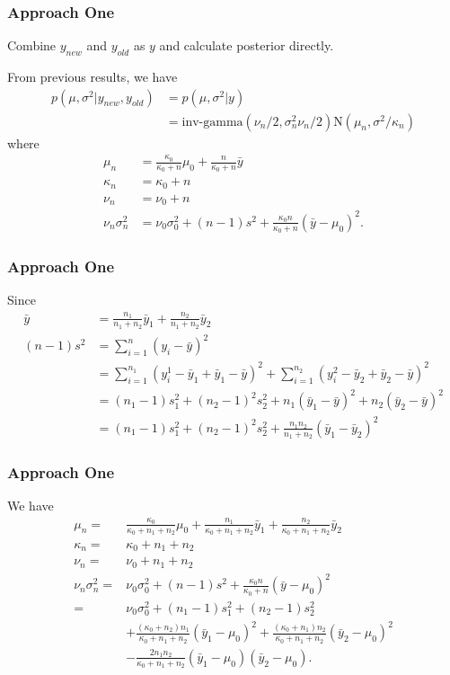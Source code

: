 \documentclass[compress]{beamer}
\begin{document}
\begin{frame}
\frametitle{Approach One }
Combine $y_{new}$ and $y_{old}$ as $y$ and calculate posterior directly.

From previous results, we have
\begin{align*}
p(\mu,\sigma^2|y_{new},y_{old})&=p(\mu,\sigma^2|y)\\
&=\mbox{inv-gamma}(\nu_n/2, \sigma_n^2\nu_n/2) \mbox{N}(\mu_n, \sigma^2/\kappa_n)
\end{align*}
where
\begin{align*}
\mu_n &= \frac{\kappa_0}{\kappa_0+n}\mu_0+\frac{n}{\kappa_0+n}\bar{y}\\
\kappa_n &=\kappa_0+n\\
\nu_n &= \nu_0+n\\
\nu_n\sigma^2_n & = \nu_0\sigma_0^2+(n-1)s^2+\frac{\kappa_0 n}{\kappa_0 +n}(\bar{y}-\mu_0)^2.
\end{align*}
\end{frame}

\begin{frame}
\frametitle{Approach One}
Since 
\begin{align*}
\bar{y} &= \frac{n_1}{n_1+n_2}\bar{y}_1+\frac{n_2}{n_1+n_2}\bar{y}_2\\
(n-1)s^2 &=\sum^n_{i=1}(y_i-\bar{y})^2\\
&=\sum^{n_1}_{i=1}(y_i^1-\bar{y}_1+\bar{y}_1-\bar{y})^2+\sum^{n_2}_{i=1}(y_i^2-\bar{y}_2+\bar{y}_2-\bar{y})^2\\
&=(n_1-1)s_1^2+(n_2-1)^2s_2^2+n_1(\bar{y}_1-\bar{y})^2+n_2(\bar{y}_2-\bar{y})^2\\
&=(n_1-1)s_1^2+(n_2-1)^2s_2^2+\frac{n_1n_2}{n_1+n_2}(\bar{y}_1-\bar{y}_2)^2
\end{align*}
\end{frame}

\begin{frame}
\frametitle{Approach One}
We have
\begin{align*}
\mu_n 
=&\frac{\kappa_0}{\kappa_0+n_1+n_2}\mu_0+\frac{n_1}{\kappa_0+n_1+n_2}\bar{y}_1+\frac{n_2}{\kappa_0+n_1+n_2}\bar{y}_2\\
\kappa_n =&\kappa_0+n_1+n_2\\
\nu_n =& \nu_0+n_1+n_2\\
\nu_n\sigma^2_n  = &\nu_0\sigma_0^2+(n-1)s^2+\frac{\kappa_0 n}{\kappa_0 +n}(\bar{y}-\mu_0)^2\\
 =& \nu_0\sigma_0^2+(n_1-1)s_1^2+(n_2-1)s_2^2\\
&+\frac{(\kappa_0+n_2)n_1}{\kappa_0+n_1+n_2}(\bar{y}_1-\mu_0)^2+\frac{(\kappa_0+n_1)n_2}{\kappa_0+n_1+n_2}(\bar{y}_2-\mu_0)^2\\
&-\frac{2n_1n_2}{\kappa_0+n_1+n_2}(\bar{y}_1-\mu_0)(\bar{y}_2-\mu_0).
\end{align*}
\end{frame}
\end{document}
